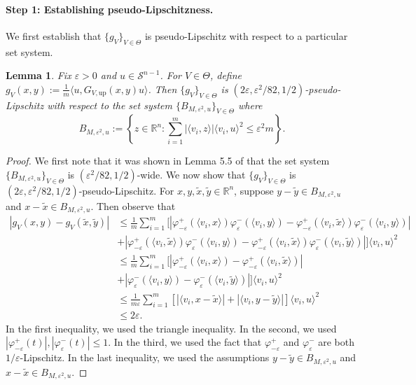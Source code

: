 \documentclass[11pt]{article}
\newcommand{\R}{\mathbb{R}}
\newcommand{\Scal}{\mathcal{S}}
\renewcommand{\epsilon}{\varepsilon}
\newtheorem{lemma}{Lemma}
\begin{document}
\paragraph{\textbf{Step 1: Establishing pseudo-Lipschitzness.}} We first establish that $\{g_V\}_{V \in \Theta}$ is pseudo-Lipschitz with respect to a particular set system. 
\begin{lemma}\label{pseudo_lipschitzness_of_gM} Fix $\epsilon > 0$ and $u \in \Scal^{n-1}$. For $V \in \Theta$, define $g_V(x,y) := \frac{1}{m}\langle u, G_{V,\text{up}}(x,y)u\rangle$. Then $\{g_V\}_{V \in \Theta}$ is $(2\epsilon,\epsilon^2/82,1/2)$-pseudo-Lipschitz with respect to the set system $\{B_{M,\epsilon^2,u}\}_{V \in \Theta}$ where $$B_{M,\epsilon^2,u} := \left\{z \in \R^n : \sum_{i=1}^m |\langle v_i,z\rangle|\langle v_i,u\rangle^2 \leqslant \epsilon^2m\right\}.$$

\end{lemma}
\begin{proof}
    We first note that it was shown in Lemma 5.5 of \cite{Daskalaskisetal2020} that the set system $\{B_{M,\epsilon^2,u}\}_{V \in \Theta}$ is  $(\epsilon^2/82,1/2)$-wide. We now show that $\{g_V\}_{V \in \Theta}$ is $(2\epsilon,\epsilon^2/82,1/2)$-pseudo-Lipschitz. For $x,y,\tilde{x},\tilde{y} \in \R^n$, suppose $y -\tilde{y} \in B_{M,\epsilon^2,u}$ and $x - \tilde{x} \in B_{M,\epsilon^2,u}$. Then observe that \begin{align*}
        |g_V(x,y) - g_V(\tilde{x},\tilde{y})|
        & \leqslant \frac{1}{m}\sum_{i=1}^m [|\varphi^+_{-\epsilon}(\langle v_i,x\rangle)\varphi^-_{\epsilon}(\langle v_i,y\rangle) - \varphi^+_{-\epsilon}(\langle v_i,\tilde{x}\rangle)\varphi^-_{\epsilon}(\langle v_i,y\rangle)| \\
        & + |\varphi^+_{-\epsilon}(\langle v_i,\tilde{x}\rangle)\varphi^-_{\epsilon}(\langle v_i,y\rangle) - \varphi^+_{-\epsilon}(\langle v_i,\tilde{x}\rangle)\varphi^-_{\epsilon}(\langle v_i,\tilde{y}\rangle)|]\langle v_i,u\rangle^2 \\
        & \leqslant \frac{1}{m}\sum_{i=1}^m [|\varphi^+_{-\epsilon}(\langle v_i,x\rangle) - \varphi^+_{-\epsilon}(\langle v_i,\tilde{x}\rangle)| \\
        & + |\varphi^-_{\epsilon}(\langle v_i,y\rangle) - \varphi^-_{\epsilon}(\langle v_i,\tilde{y}\rangle)|]\langle v_i,u\rangle^2 \\
        & \leqslant \frac{1}{m \epsilon}\sum_{i=1}^m[|\langle v_i, x- \tilde{x}\rangle| + |\langle v_i,y-\tilde{y}\rangle|]\langle v_i,u\rangle^2 \\
        & \leqslant 2\epsilon.
    \end{align*} In the first inequality, we used the triangle inequality. In the second, we used $|\varphi^+_{-\epsilon}(t)|,|\varphi^-_{\epsilon}(t)|\leqslant 1$. In the third, we used the fact that $\varphi^+_{-\epsilon}$ and $\varphi^-_{\epsilon}$ are both $1/\epsilon$-Lipschitz. In the last inequality, we used the assumptions $y -\tilde{y} \in B_{M,\epsilon^2,u}$ and $x - \tilde{x} \in B_{M,\epsilon^2,u}$. 
\end{proof}
\end{document}
